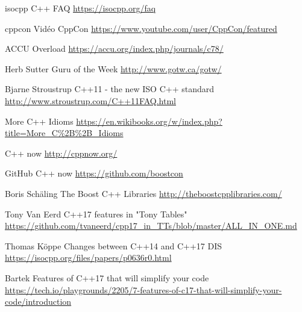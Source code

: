 \documentclass[C++.tex]{subfiles}
\begin{document}
\begin{frame}[allowframebreaks]
\begin{thebibliography}{1}
		isocpp
		\newblock C++ FAQ
		\newblock \url{https://isocpp.org/faq}

		cppcon
		\newblock Vidéo CppCon
		\newblock \url{https://www.youtube.com/user/CppCon/featured}

		ACCU
		\newblock Overload
		\newblock \url{https://accu.org/index.php/journals/c78/}

		Herb Sutter
		\newblock Guru of the Week
		\newblock \url{http://www.gotw.ca/gotw/}

		Bjarne Stroustrup
		\newblock C++11 - the new ISO C++ standard
		\newblock \url{http://www.stroustrup.com/C++11FAQ.html}
			
		\newblock More C++ Idioms
		\newblock \url{https://en.wikibooks.org/w/index.php?title=More\_C\%2B\%2B\_Idioms}

		\newblock C++ now
		\newblock \url{http://cppnow.org/}

		\newblock GitHub C++ now
		\newblock \url{https://github.com/boostcon}

		Boris Schäling
		\newblock The Boost C++ Libraries
		\newblock \url{http://theboostcpplibraries.com/}

		Tony Van Eerd
		\newblock C++17 features in "Tony Tables"
		\newblock \url{https://github.com/tvaneerd/cpp17_in_TTs/blob/master/ALL_IN_ONE.md}

		Thomas Köppe
		\newblock Changes between C++14 and C++17 DIS
		\newblock \url{https://isocpp.org/files/papers/p0636r0.html}

		Bartek
		 Features of C++17 that will simplify your code
		\newblock \url{https://tech.io/playgrounds/2205/7-features-of-c17-that-will-simplify-your-code/introduction}
	\end{thebibliography}
\end{frame}
\end{document}
